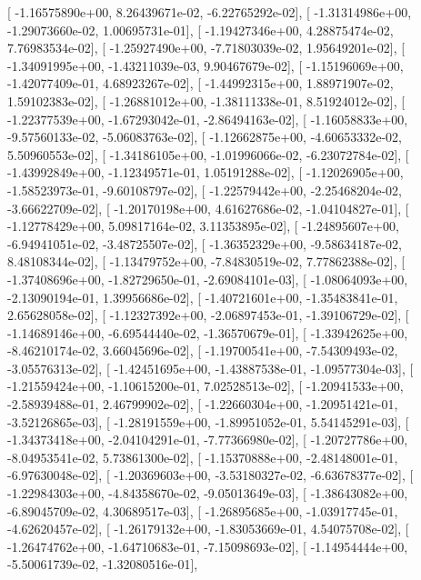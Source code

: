 \documentclass{article}
\begin{document}
       [ -1.16575890e+00,   8.26439671e-02,  -6.22765292e-02],
       [ -1.31314986e+00,  -1.29073660e-02,   1.00695731e-01],
       [ -1.19427346e+00,   4.28875474e-02,   7.76983534e-02],
       [ -1.25927490e+00,  -7.71803039e-02,   1.95649201e-02],
       [ -1.34091995e+00,  -1.43211039e-03,   9.90467679e-02],
       [ -1.15196069e+00,  -1.42077409e-01,   4.68923267e-02],
       [ -1.44992315e+00,   1.88971907e-02,   1.59102383e-02],
       [ -1.26881012e+00,  -1.38111338e-01,   8.51924012e-02],
       [ -1.22377539e+00,  -1.67293042e-01,  -2.86494163e-02],
       [ -1.16058833e+00,  -9.57560133e-02,  -5.06083763e-02],
       [ -1.12662875e+00,  -4.60653332e-02,   5.50960553e-02],
       [ -1.34186105e+00,  -1.01996066e-02,  -6.23072784e-02],
       [ -1.43992849e+00,  -1.12349571e-01,   1.05191288e-02],
       [ -1.12026905e+00,  -1.58523973e-01,  -9.60108797e-02],
       [ -1.22579442e+00,  -2.25468204e-02,  -3.66622709e-02],
       [ -1.20170198e+00,   4.61627686e-02,  -1.04104827e-01],
       [ -1.12778429e+00,   5.09817164e-02,   3.11353895e-02],
       [ -1.24895607e+00,  -6.94941051e-02,  -3.48725507e-02],
       [ -1.36352329e+00,  -9.58634187e-02,   8.48108344e-02],
       [ -1.13479752e+00,  -7.84830519e-02,   7.77862388e-02],
       [ -1.37408696e+00,  -1.82729650e-01,  -2.69084101e-03],
       [ -1.08064093e+00,  -2.13090194e-01,   1.39956686e-02],
       [ -1.40721601e+00,  -1.35483841e-01,   2.65628058e-02],
       [ -1.12327392e+00,  -2.06897453e-01,  -1.39106729e-02],
       [ -1.14689146e+00,  -6.69544440e-02,  -1.36570679e-01],
       [ -1.33942625e+00,  -8.46210174e-02,   3.66045696e-02],
       [ -1.19700541e+00,  -7.54309493e-02,  -3.05576313e-02],
       [ -1.42451695e+00,  -1.43887538e-01,  -1.09577304e-03],
       [ -1.21559424e+00,  -1.10615200e-01,   7.02528513e-02],
       [ -1.20941533e+00,  -2.58939488e-01,   2.46799902e-02],
       [ -1.22660304e+00,  -1.20951421e-01,  -3.52126865e-03],
       [ -1.28191559e+00,  -1.89951052e-01,   5.54145291e-03],
       [ -1.34373418e+00,  -2.04104291e-01,  -7.77366980e-02],
       [ -1.20727786e+00,  -8.04953541e-02,   5.73861300e-02],
       [ -1.15370888e+00,  -2.48148001e-01,  -6.97630048e-02],
       [ -1.20369603e+00,  -3.53180327e-02,  -6.63678377e-02],
       [ -1.22984303e+00,  -4.84358670e-02,  -9.05013649e-03],
       [ -1.38643082e+00,  -6.89045709e-02,   4.30689517e-03],
       [ -1.26895685e+00,  -1.03917745e-01,  -4.62620457e-02],
       [ -1.26179132e+00,  -1.83053669e-01,   4.54075708e-02],
       [ -1.26474762e+00,  -1.64710683e-01,  -7.15098693e-02],
       [ -1.14954444e+00,  -5.50061739e-02,  -1.32080516e-01],
\end{document}
